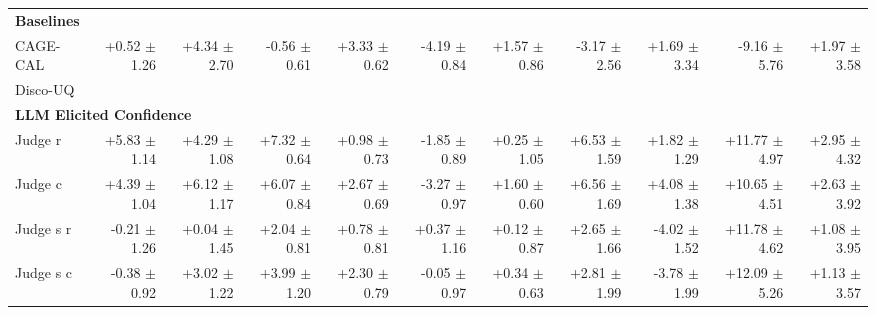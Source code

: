 \begin{table}[t]
{\begin{tabular}{lrr|rr|rr|rr|rr}
\midrule
\multicolumn{11}{l}{\textbf{Baselines}}\\
CAGE-CAL & +0.52 {\scriptsize $\pm$ 1.26} & +4.34 {\scriptsize $\pm$ 2.70} & -0.56 {\scriptsize $\pm$ 0.61} & +3.33 {\scriptsize $\pm$ 0.62} & -4.19 {\scriptsize $\pm$ 0.84} & +1.57 {\scriptsize $\pm$ 0.86} & -3.17 {\scriptsize $\pm$ 2.56} & +1.69 {\scriptsize $\pm$ 3.34} & -9.16 {\scriptsize $\pm$ 5.76} & +1.97 {\scriptsize $\pm$ 3.58} \\
Disco-UQ & \\
\midrule
\multicolumn{11}{l}{\textbf{LLM Elicited Confidence}}\\
Judge r & +5.83 {\scriptsize $\pm$ 1.14} & +4.29 {\scriptsize $\pm$ 1.08} & +7.32 {\scriptsize $\pm$ 0.64} & +0.98 {\scriptsize $\pm$ 0.73} & -1.85 {\scriptsize $\pm$ 0.89} & +0.25 {\scriptsize $\pm$ 1.05} & +6.53 {\scriptsize $\pm$ 1.59} & +1.82 {\scriptsize $\pm$ 1.29} & +11.77 {\scriptsize $\pm$ 4.97} & +2.95 {\scriptsize $\pm$ 4.32} \\
Judge c & +4.39 {\scriptsize $\pm$ 1.04} & +6.12 {\scriptsize $\pm$ 1.17} & +6.07 {\scriptsize $\pm$ 0.84} & +2.67 {\scriptsize $\pm$ 0.69} & -3.27 {\scriptsize $\pm$ 0.97} & +1.60 {\scriptsize $\pm$ 0.60} & +6.56 {\scriptsize $\pm$ 1.69} & +4.08 {\scriptsize $\pm$ 1.38} & +10.65 {\scriptsize $\pm$ 4.51} & +2.63 {\scriptsize $\pm$ 3.92} \\
Judge s r & -0.21 {\scriptsize $\pm$ 1.26} & +0.04 {\scriptsize $\pm$ 1.45} & +2.04 {\scriptsize $\pm$ 0.81} & +0.78 {\scriptsize $\pm$ 0.81} & +0.37 {\scriptsize $\pm$ 1.16} & +0.12 {\scriptsize $\pm$ 0.87} & +2.65 {\scriptsize $\pm$ 1.66} & -4.02 {\scriptsize $\pm$ 1.52} & +11.78 {\scriptsize $\pm$ 4.62} & +1.08 {\scriptsize $\pm$ 3.95} \\
Judge s c & -0.38 {\scriptsize $\pm$ 0.92} & +3.02 {\scriptsize $\pm$ 1.22} & +3.99 {\scriptsize $\pm$ 1.20} & +2.30 {\scriptsize $\pm$ 0.79} & -0.05 {\scriptsize $\pm$ 0.97} & +0.34 {\scriptsize $\pm$ 0.63} & +2.81 {\scriptsize $\pm$ 1.99} & -3.78 {\scriptsize $\pm$ 1.99} & +12.09 {\scriptsize $\pm$ 5.26} & +1.13 {\scriptsize $\pm$ 3.57} \\



\bottomrule
\end{tabular}%
}
\end{table}
